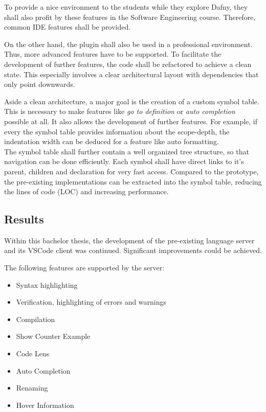 To provide a nice environment to the students while they explore Dafny, they shall also profit by these features in the Software Engineering course.
Therefore, common IDE features shall be provided.

On the other hand, the plugin shall also be used in a professional environment.
Thus, more advanced features have to be supported.
To facilitate the development of further features, the code shall be refactored to achieve a clean state.
This especially involves a clear architectural layout with dependencies that only point downwards.

Aside a clean architecture, a major goal is the creation of a custom symbol table.
This is necessary to make features like \textit{go to definition} or \textit{auto completion} possible at all.
It also allows the development of further features.
For example, if every the symbol table provides information about the scope-depth, the indentation width can be deduced for a feature like auto formatting.\\

The symbol table shall further contain a well organized tree structure, so that navigation can be done efficiently.
Each symbol shall have direct links to it's parent, children and declaration for very fast access.
Compared to the prototype, the pre-existing implementations can be extracted into the symbol table, reducing the lines of code (LOC) and increasing performance.



\subsection{Results}
\label{section:managment_summary:results}
Within this bachelor thesis, the development of the pre-existing language server and its VSCode client was continued.
Significant improvements could be achieved.

The following features are supported by the server:
\begin{itemize}
    \item Syntax highlighting
    \item Verification, highlighting of errors and warnings
    \item Compilation
    \item Show Counter Example
    \item Code Lens
    \item Auto Completion
    \item Renaming
    \item Hover Information
\end{itemize}

